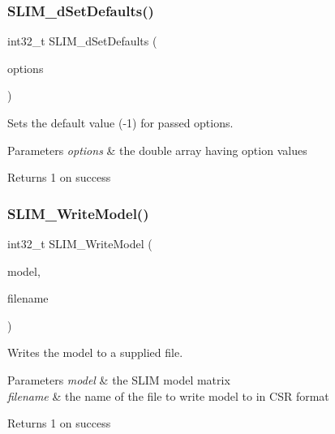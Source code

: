 \subsubsection{\texorpdfstring{S\+L\+I\+M\+\_\+d\+Set\+Defaults()}{SLIM\_dSetDefaults()}}
{\footnotesize\ttfamily int32\+\_\+t S\+L\+I\+M\+\_\+d\+Set\+Defaults (\begin{DoxyParamCaption}\item[{double $\ast$}]{options }\end{DoxyParamCaption})}



Sets the default value (-\/1) for passed options. 


\begin{DoxyParams}{Parameters}
{\em options} & the double array having option values \\
\hline
\end{DoxyParams}
\begin{DoxyReturn}{Returns}
1 on success 
\end{DoxyReturn}
\mbox{\label{group__slimapi_ga4a73297a1dcf82ed110a1bb349120f2a}} 
\subsubsection{\texorpdfstring{S\+L\+I\+M\+\_\+\+Write\+Model()}{SLIM\_WriteModel()}}
{\footnotesize\ttfamily int32\+\_\+t S\+L\+I\+M\+\_\+\+Write\+Model (\begin{DoxyParamCaption}\item[{slim\+\_\+t $\ast$}]{model,  }\item[{char $\ast$}]{filename }\end{DoxyParamCaption})}



Writes the model to a supplied file. 


\begin{DoxyParams}{Parameters}
{\em model} & the S\+L\+IM model matrix \\
\hline
{\em filename} & the name of the file to write model to in C\+SR format \\
\hline
\end{DoxyParams}
\begin{DoxyReturn}{Returns}
1 on success 
\end{DoxyReturn}
\mbox{\label{group__slimapi_ga6ee60da1ee298e093723e9dfd9f21f1c}} 
